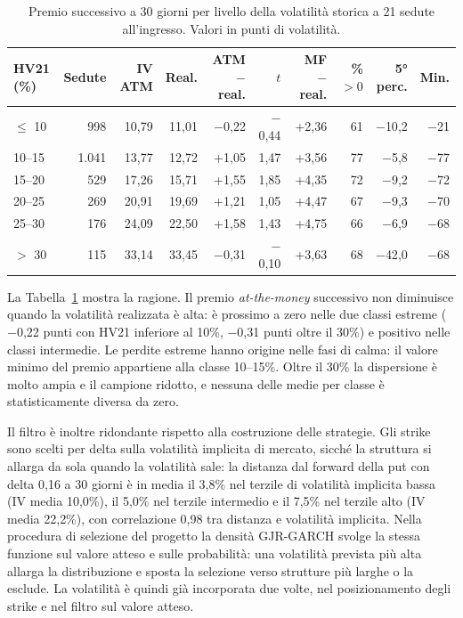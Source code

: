 \documentclass[11pt,a4paper]{article}
\begin{document}
\begin{table}[ht]\centering\small
\caption{Premio successivo a 30 giorni per livello della volatilità storica a 21 sedute all'ingresso. Valori in punti di volatilità.}\label{tab:hv}
\begin{tabular}{lrrrrrrrrr}\toprule
HV21 (\%) & Sedute & IV ATM & Real. & ATM $-$ real. & $t$ & MF $-$ real. & \% $>0$ & 5° perc. & Min. \\ \midrule
$\le$ 10 & 998 & 10{,}79 & 11{,}01 & $-$0{,}22 & $-$0{,}44 & +2{,}36 & 61 & $-$10{,}2 & $-$21 \\
10--15 & 1.041 & 13{,}77 & 12{,}72 & +1{,}05 & 1{,}47 & +3{,}56 & 77 & $-$5{,}8 & $-$77 \\
15--20 & 529 & 17{,}26 & 15{,}71 & +1{,}55 & 1{,}85 & +4{,}35 & 72 & $-$9{,}2 & $-$72 \\
20--25 & 269 & 20{,}91 & 19{,}69 & +1{,}21 & 1{,}05 & +4{,}47 & 67 & $-$9{,}3 & $-$70 \\
25--30 & 176 & 24{,}09 & 22{,}50 & +1{,}58 & 1{,}43 & +4{,}75 & 66 & $-$6{,}9 & $-$68 \\
$>$ 30 & 115 & 33{,}14 & 33{,}45 & $-$0{,}31 & $-$0{,}10 & +3{,}63 & 68 & $-$42{,}0 & $-$68 \\
\bottomrule\end{tabular}\end{table}

La Tabella~\ref{tab:hv} mostra la ragione. Il premio \emph{at-the-money} successivo non diminuisce quando la volatilità realizzata è alta: è prossimo a zero nelle due classi estreme ($-$0{,}22 punti con HV21 inferiore al 10\%, $-$0{,}31 punti oltre il 30\%) e positivo nelle classi intermedie. Le perdite estreme hanno origine nelle fasi di calma: il valore minimo del premio appartiene alla classe 10--15\%. Oltre il 30\% la dispersione è molto ampia e il campione ridotto, e nessuna delle medie per classe è statisticamente diversa da zero.

Il filtro è inoltre ridondante rispetto alla costruzione delle strategie. Gli strike sono scelti per delta sulla volatilità implicita di mercato, sicché la struttura si allarga da sola quando la volatilità sale: la distanza dal forward della put con delta 0{,}16 a 30 giorni è in media il 3{,}8\% nel terzile di volatilità implicita bassa (IV media 10{,}0\%), il 5{,}0\% nel terzile intermedio e il 7{,}5\% nel terzile alto (IV media 22{,}2\%), con correlazione 0{,}98 tra distanza e volatilità implicita. Nella procedura di selezione del progetto la densità GJR-GARCH svolge la stessa funzione sul valore atteso e sulle probabilità: una volatilità prevista più alta allarga la distribuzione e sposta la selezione verso strutture più larghe o la esclude. La volatilità è quindi già incorporata due volte, nel posizionamento degli strike e nel filtro sul valore atteso.
\end{document}
